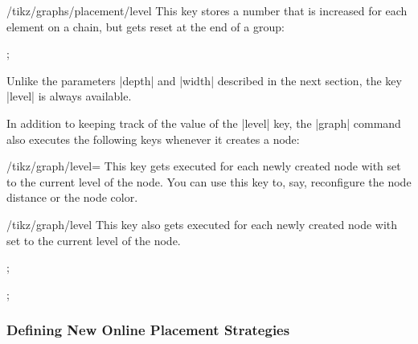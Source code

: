 \begin{key}{/tikz/graphs/placement/level}
    This key stores a number that is increased for each element on a chain, but
    gets reset at the end of a group:
\begin{codeexample}[preamble={\usetikzlibrary{graphs}}]
\tikz {};
\end{codeexample}
    Unlike the parameters |depth| and |width| described in the next section,
    the key |level| is always available.
\end{key}

In addition to keeping track of the value of the |level| key, the |graph|
command also executes the following keys whenever it creates a node:

\begin{stylekey}{/tikz/graph/level=}
    This key gets executed for each newly created node with  set to
    the current level of the node. You can use this key to, say, reconfigure
    the node distance or the node color.
\end{stylekey}

\begin{stylekey}{/tikz/graph/level }
    This key also gets executed for each newly created node with 
    set to the current level of the node.
\begin{codeexample}[preamble={\usetikzlibrary{graphs}}]
\tikz {};
\end{codeexample}
\begin{codeexample}[preamble={\usetikzlibrary{graphs}}]
\tikz {};
\end{codeexample}
\end{stylekey}


\subsubsection{Defining New Online Placement Strategies}
\label{section-library-graphs-new-online}

